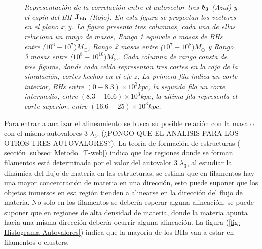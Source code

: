 \begin{figure}
\caption{\emph{Representación de la correlación entre el autovector tres ${\bf{\vec{e}}_{3}}$ (Azul) y el espín del BH ${\bf{J_{bh}}}$ (Rojo). En esta figura se proyectan los vectores en el plano $x,y$. La figura presenta tres columnas, cada una de ellas relaciona un rango de masas, Rango 1 equivale a masas de BHs entre ($10^6-10^7)M_{\odot}$, Rango 2 masas entre ($10^7-10^8)M_{\odot}$ y Rango 3 masas entre ($10^8-10^10)M_{\odot}$. Cada columna de rango consta de tres figuras, donde cada celda  representan tres cortes en la caja de la simulación, cortes hechos en el eje $z$, La primera fila indica un corte interior, BHs entre $(0-8.3)\times10^{3} kpc$,  la segunda fila un corte intermedio, entre $(8.3-16.6)\times10^{3} kpc$, la ultima fila representa el corte superior, entre  $ (16.6-25)\times10^{3} kpc$. }} 
\label{fig: proyeccion espines} 
\end{figure}

Para entrar a analizar el alineamiento se busca su posible relación con la masa o con el mismo autovalores 3 $\lambda_{3}$. (¿PONGO QUE EL ANALISIS PARA LOS OTROS TRES AUTOVALORES?). La teoría de formación de estructuras ( sección \ref{subsec: Metodo_T-web}) indica que las regiones donde se forman filamentos está determinada por el valor del autovalor 3 $\lambda_{3}$, al estudiar la dinámica del flujo de materia en las estructuras, se estima  que en filamentos hay una mayor concentración de materia en una dirección, esto puede suponer que los objetos inmersos en esa región tienden a alinearse en la dirección del flujo de materia. No solo en los filamentos se debería esperar alguna alineación, se puede suponer que en regiones de alta densidad de materia, donde la materia apunta hacia una misma dirección debería ocurrir alguna alineación. La figura (\ref{fig: Histograma Autovalores}) indica que la mayoría de los BHs van a estar en filamentos o clusters. 

